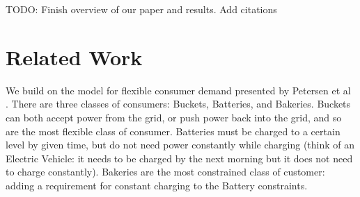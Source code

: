 \documentclass[conference]{IEEEtran}
\begin{document}


TODO: Finish overview of our paper and results. Add citations

\section{Related Work}
\label{Related Work}

We build on the model for flexible consumer demand presented by Petersen et al \cite{petersen2013taxonomy}. There are three classes of consumers: Buckets, Batteries, and Bakeries. Buckets can both accept power from the grid, or push power back into the grid, and so are the most flexible class of consumer. Batteries must be charged to a certain level by given time, but do not need power constantly while charging (think of an Electric Vehicle: it needs to be charged by the next morning but it does not need to charge constantly). Bakeries are the most constrained class of customer: adding a requirement for constant charging to the Battery constraints.
\end{document}
